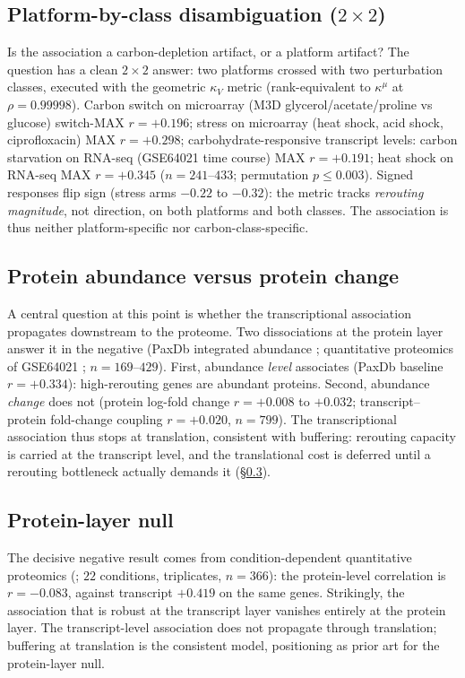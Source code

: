 \documentclass[11pt,a4paper]{article}
\theoremstyle{plain}
\theoremstyle{definition}
\theoremstyle{remark}
\newcommand{\kk}{\kappa_{\!V}}
\newcommand{\kmu}{\kappa^{\mu}}
\begin{document}
\subsection{Platform-by-class disambiguation ($2 \times 2$)}
\label{sec:e25}
Is the association a carbon-depletion artifact, or a platform
artifact? The question has a clean $2 \times 2$ answer: two platforms
crossed with two perturbation classes, executed with the geometric $\kk$ metric
(rank-equivalent to $\kmu$ at $\rho = 0.99998$). Carbon switch on
microarray (M3D glycerol/acetate/proline vs glucose) switch-MAX $r =
+0.196$; stress on microarray (heat shock, acid shock, ciprofloxacin)
MAX $r = +0.298$; carbohydrate-responsive transcript levels: carbon
starvation on RNA-seq (GSE64021 \citep{barrett2013} time course) MAX
$r = +0.191$; heat shock on RNA-seq MAX $r = +0.345$ ($n = 241$--$433$;
permutation $p \le 0.003$). Signed responses flip sign (stress arms
$-0.22$ to $-0.32$): the metric tracks \emph{rerouting magnitude},
not direction, on both platforms and both classes. The association is
thus neither platform-specific nor carbon-class-specific.

\subsection{Protein abundance versus protein change}
\label{sec:e26}
A central question at this point is whether the transcriptional
association propagates downstream to the proteome. Two dissociations
at the protein layer answer it in the negative (PaxDb integrated
abundance \citep{wang2015}; quantitative proteomics of GSE64021
\citep{barrett2013};
$n = 169$--$429$). First, abundance \emph{level} associates (PaxDb
baseline $r = +0.334$): high-rerouting genes are abundant proteins.
Second, abundance \emph{change} does not (protein log-fold change $r
= +0.008$ to $+0.032$; transcript--protein fold-change coupling
$r = +0.020$, $n = 799$). The transcriptional association thus stops
at translation, consistent with buffering: rerouting capacity is
carried at the transcript level, and the translational cost is
deferred until a rerouting bottleneck actually demands it
(\S\ref{sec:e27}).

\subsection{Protein-layer null}
\label{sec:e27}
The decisive negative result comes from condition-dependent
quantitative proteomics (\citet{schmidt2016}; $22$ conditions, triplicates,
$n = 366$): the protein-level correlation is $r = -0.083$, against
transcript $+0.419$ on the same genes. Strikingly, the association
that is robust at the transcript layer vanishes entirely at the
protein layer. The transcript-level association does not propagate
through translation; buffering at translation is the consistent
model, positioning \citet{kochanowski2013} as prior art for the
protein-layer null.
\end{document}
